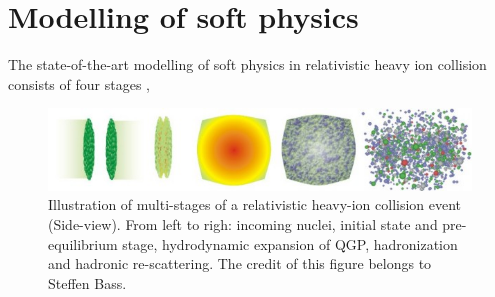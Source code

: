 \documentclass[aps,prl,twocolumn,groupedaddress]{revtex4-1}
\begin{document}
\section{Modelling of soft physics}
	The state-of-the-art modelling of soft physics in relativistic heavy ion collision consists of four stages \citep{Bass:2000ib, Shen:2014vra},
	\begin{figure}
	\begin{center}
	\includegraphics[width=\columnwidth]{pics/evo.jpg}
	\caption{Illustration of multi-stages of a relativistic heavy-ion collision event (Side-view). From left to righ: incoming nuclei, initial state and pre-equilibrium stage, hydrodynamic expansion of QGP, hadronization and hadronic re-scattering. The credit of this figure belongs to Steffen Bass.}
	\label{hybrid}
	\end{center}
	\end{figure}
\end{document}
